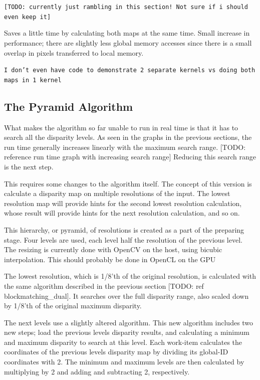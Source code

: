 \texttt{[TODO: currently just rambling in this section! Not sure if i
  should even keep it]}

Saves a little time by calculating both maps at the same time. Small
increase in performance; there are slightly less global memory
accesses since there is a small overlap in pixels transferred to local
memory.

\texttt{I don't even have code to demonstrate 2 separate kernels vs
  doing both maps in 1 kernel}


\subsection{The Pyramid Algorithm}

What makes the algorithm so far unable to run in real time is that it
has to search all the disparity levels. As seen in the graphs in the
previous sections, the run time generally increases linearly with the
maximum search range. [TODO: reference run time graph with increasing
search range] Reducing this search range is the next step.

This requires some changes to the algorithm itself. The concept of
this version is calculate a disparity map on multiple resolutions of
the input. The lowest resolution map will provide hints for the second
lowest resolution calculation, whose result will provide hints for the
next resolution calculation, and so on.

This hierarchy, or pyramid, of resolutions is created as a part of the
preparing stage. Four levels are used, each level half the resolution
of the previous level. The resizing is currently done with OpenCV on
the host, using bicubic interpolation. This should probably be done in
OpenCL on the GPU

The lowest resolution, which is 1/8'th of the original resolution, is
calculated with the same algorithm described in the previous section
[TODO: ref blockmatching\_dual]. It searches over the full disparity
range, also scaled down by 1/8'th of the original maximum disparity.

The next levels use a slightly altered algorithm. This new algorithm
includes two new steps; load the previous levels disparity results,
and calculating a minimum and maximum disparity to search at this
level. Each work-item calculates the coordinates of the previous
levels disparity map by dividing its global-ID coordinates with 2. The
minimum and maximum levels are then calculated by multiplying by 2 and
adding and subtracting 2, respectively.




